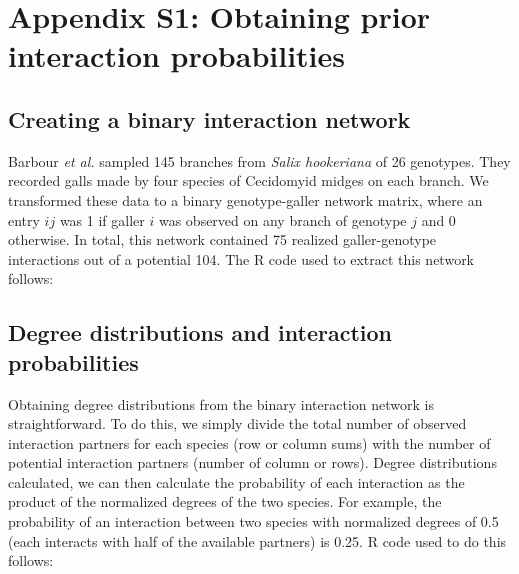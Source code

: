 \section*{Appendix S1: Obtaining prior interaction probabilities}

    \subsection*{Creating a binary interaction network}

      Barbour \emph{et al.} sampled 145 branches from \emph{Salix hookeriana} of 26 genotypes. They recorded galls made by four species of Cecidomyid midges on each branch. We transformed these data to a binary genotype-galler network matrix, where an entry $ij$ was 1 if galler $i$ was observed on any branch of genotype $j$ and 0 otherwise. In total, this network contained 75 realized galler-genotype interactions out of a potential 104. The R code used to extract this network follows:



    \subsection*{Degree distributions and interaction probabilities}

      Obtaining degree distributions from the binary interaction network is straightforward. To do this, we simply divide the total number of observed interaction partners for each species (row or column sums) with the number of potential interaction partners (number of column or rows). Degree distributions calculated, we can then calculate the probability of each interaction as the product of the normalized degrees of the two species. For example, the probability of an interaction between two species with normalized degrees of 0.5 (each interacts with half of the available partners) is 0.25. R code used to do this follows:

